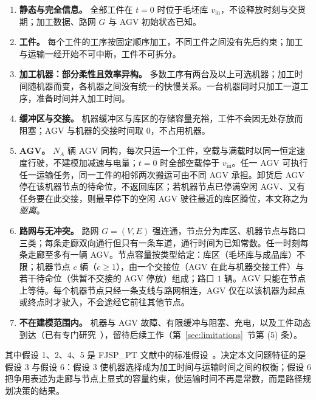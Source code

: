 \documentclass[manuscript,screen,review]{acmart}
\begin{document}
\begin{enumerate}[label=\textbf{假设 \arabic*.},leftmargin=*,topsep=2pt,itemsep=2pt]
\item \textbf{静态与完全信息。} 全部工件在 $t=0$ 时位于毛坯库 $v_{\mathrm{in}}$，不设释放时刻与交货期；加工数据、路网 $G$ 与 AGV 初始状态已知。

\item \textbf{工件。} 每个工件的工序按固定顺序加工，不同工件之间没有先后约束；加工与运输一经开始不可中断，工件不可拆分。

\item \textbf{加工机器：部分柔性且效率异构。} 多数工序有两台及以上可选机器；加工时间随机器而变，各机器之间没有统一的快慢关系。一台机器同时只加工一道工序，准备时间并入加工时间。

\item \textbf{缓冲区与交接。} 机器缓冲区与库区的存储容量充裕，工件不会因无处存放而阻塞；AGV 与机器的交接时间取 $0$，不占用机器。

\item \textbf{AGV。} $N_A$ 辆 AGV 同构，每次只运一个工件，空载与满载时以同一恒定速度行驶，不建模加减速与电量；$t=0$ 时全部空载停于 $v_{\mathrm{in}}$。任一 AGV 可执行任一运输任务，同一工件的相邻两次搬运可由不同 AGV 承担。卸货后 AGV 停在该机器节点的待命位，不返回库区；若机器节点已停满空闲 AGV、又有任务要在此交接，则最早停下的空闲 AGV 驶往最近的库区腾位，本文称之为\emph{驱离}。

\item \textbf{路网与无冲突。} 路网 $G=(V,E)$ 强连通，节点分为库区、机器节点与路口三类；每条走廊双向通行但只有一条车道，通行时间为已知常数。任一时刻每条走廊至多有一辆 AGV。节点容量按类型给定：库区（毛坯库与成品库）不限；机器节点 $c$ 辆（$c\ge1$），由一个交接位（AGV 在此与机器交接工件）与若干待命位（供暂不交接的 AGV 停放）组成；路口 $1$ 辆。AGV 只能在节点上等待。每个机器节点只经一条支线与路网相连，AGV 仅在以该机器为起点或终点时才驶入，不会途经它前往其他节点。

\item \textbf{不在建模范围内。} 机器与 AGV 故障、有限缓冲与阻塞、充电，以及工件动态到达（已有专门研究~\cite{gui2023dynamic,zhao2026deep}），留待后续工作（第~\ref{sec:limitations}~节第 (5) 条）。
\end{enumerate}

其中假设 1、2、4、5 是 FJSP\_PT 文献中的标准假设~\cite{xin2025review}。决定本文问题特征的是假设 3 与假设 6：假设 3 使机器选择成为加工时间与运输时间之间的权衡；假设 6 把争用表述为走廊与节点上显式的容量约束，使运输时间不再是常数，而是路径规划决策的结果。
\end{document}
